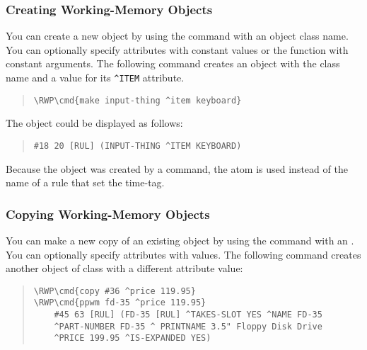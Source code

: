 \subsubsection{Creating Working-Memory Objects}

You can create a new object by using the  command with an
object class name. You can optionally specify attributes with constant
values or the  function with constant arguments. The
following command creates an object with the class name
 and a value for its \verb|^ITEM| attribute.

\begin{quote}
\begin{Verbatim}[commandchars=\\\{\}]
\RWP\cmd{make input-thing ^item keyboard}
\end{Verbatim}
\end{quote}

The object could be displayed as follows:

\begin{quote}
\begin{verbatim}
#18 20 [RUL] (INPUT-THING ^ITEM KEYBOARD)
\end{verbatim}
\end{quote}  

Because the object was created by a command, the atom  is used
instead of the name of a rule that set the time-tag.

\subsubsection{Copying Working-Memory Objects}

You can make a new copy of an existing object by using the 
command with an . You can optionally specify
attributes with values. The following command creates another object
of class  with a different attribute value:

\begin{quote}
\begin{Verbatim}[commandchars=\\\{\}]
\RWP\cmd{copy #36 ^price 119.95}
\RWP\cmd{ppwm fd-35 ^price 119.95}
    #45 63 [RUL] (FD-35 [RUL] ^TAKES-SLOT YES ^NAME FD-35
    ^PART-NUMBER FD-35 ^ PRINTNAME 3.5" Floppy Disk Drive
    ^PRICE 199.95 ^IS-EXPANDED YES)
\end{Verbatim}
\end{quote}

